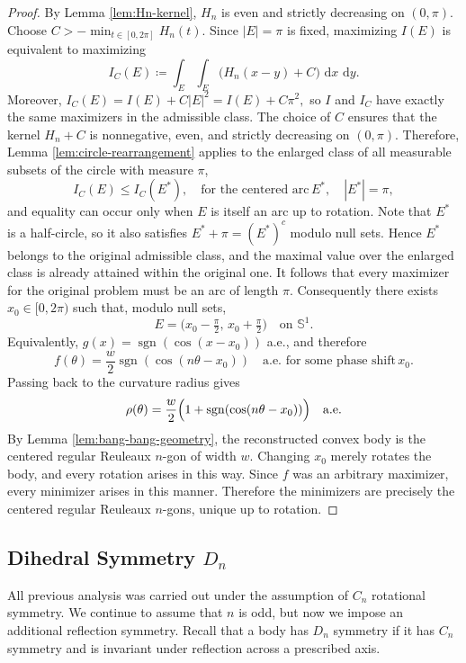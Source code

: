 \documentclass[11pt,letterpaper,reqno]{amsart}
\newcommand{\dd}{\,\mathrm{d}}
\begin{document}
\begin{proof}
By Lemma \ref{lem:Hn-kernel}, $H_n$ is even and strictly decreasing on $(0,\pi)$.
Choose $C> -\min_{t\in[0,2\pi]}H_n(t)$. Since $|E|=\pi$ is fixed, maximizing $I(E)$ is equivalent to maximizing
\[
I_C(E)\coloneqq \int_E\int_E \bigl(H_n(x-y)+C\bigr)\,\dd x\,\dd y.
\]
Moreover,
\(
I_C(E)=I(E)+C|E|^2=I(E)+C\pi^2,
\)
so $I$ and $I_C$ have exactly the same maximizers in the admissible class. The choice of $C$ ensures that the kernel $H_n+C$ is nonnegative, even, and strictly decreasing on $(0,\pi)$. Therefore, Lemma \ref{lem:circle-rearrangement} applies to the enlarged class of all measurable subsets of the circle with measure $\pi$,
\[
I_C(E)\le I_C(E^*), \quad \text{for the centered arc} \, E^*, \quad |E^*|=\pi,
\]
and equality can occur only when $E$ is itself an arc up to rotation.
Note that $E^*$ is a half-circle, so it also satisfies
\(
E^*+\pi=(E^*)^c
\)
modulo null sets. Hence $E^*$ belongs to the original admissible class, and the maximal value over the enlarged class is already attained within the original one. It follows that every maximizer for the original problem must be an arc of length $\pi$. Consequently there exists $x_0\in[0,2\pi)$ such that, modulo null sets,
\[
E=\bigl(x_0-\tfrac{\pi}{2},\,x_0+\tfrac{\pi}{2}\bigr)
\quad\text{on} \, \, \mathbb{S}^1.
\]
Equivalently,
\(
g(x)=\operatorname{sgn}(\cos(x-x_0))
\)
a.e., and therefore
\[
f(\theta)=\frac w2\operatorname{sgn}(\cos(n\theta-x_0))\quad\text{a.e. for some phase shift} \, x_0.
\]
Passing back to the curvature radius gives
\[
\rho(\theta)=\frac w2\Bigl(1+\operatorname{sgn}(\cos(n\theta-x_0))\Bigr)
\quad\text{a.e.}
\]
By Lemma \ref{lem:bang-bang-geometry}, the reconstructed convex body is the centered regular Reuleaux $n$-gon of width $w$. Changing $x_0$ merely rotates the body, and every rotation arises in this way. Since $f$ was an arbitrary maximizer, every minimizer arises in this manner. Therefore the minimizers are precisely the centered regular Reuleaux $n$-gons, unique up to rotation.
\end{proof}

\subsection{Dihedral Symmetry \texorpdfstring{$D_n$}{Dn}}

All previous analysis was carried out under the assumption of $C_n$ rotational symmetry. We continue to assume that $n$ is odd, but now we impose an additional reflection symmetry. Recall that a body has $D_n$ symmetry if it has $C_n$ symmetry and is invariant under reflection across a prescribed axis. 
\end{document}
